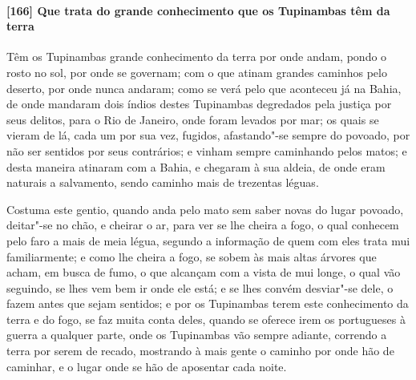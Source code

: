 \begin{linenumbers}
\paragraph{[166] Que trata do grande conhecimento que os Tupinambas têm da terra}\quad
Têm os Tupinambas grande conhecimento da terra por onde andam, pondo o rosto no sol, por
onde se governam; com o que atinam grandes caminhos pelo deserto, por onde nunca andaram;
como se verá pelo que aconteceu já na Bahia, de onde mandaram dois índios destes
Tupinambas degredados pela justiça por seus delitos, para o Rio de Janeiro, onde foram
levados por mar; os quais se vieram de lá, cada um por sua vez, fugidos, afastando"-se
sempre do povoado, por não ser sentidos por seus contrários; e vinham sempre caminhando
pelos matos; e desta maneira atinaram com a Bahia, e chegaram à sua aldeia, de onde eram
naturais a salvamento, sendo caminho mais de trezentas léguas.

Costuma este gentio, quando anda pelo mato sem saber novas do lugar povoado, deitar"-se no
chão, e cheirar o ar, para ver se lhe cheira a fogo, o qual conhecem pelo faro a mais de
meia légua, segundo a informação de quem com eles trata mui familiarmente; e como lhe
cheira a fogo, se sobem às mais altas árvores que acham, em busca de fumo, o que alcançam
com a vista de mui longe, o qual vão seguindo, se lhes vem bem ir onde ele está; e se lhes
convém desviar"-se dele, o fazem antes que sejam sentidos; e por os Tupinambas terem este
conhecimento da terra e do fogo, se faz muita conta deles, quando se oferece irem os
portugueses à guerra a qualquer parte, onde os Tupinambas vão sempre adiante, correndo a
terra por serem de recado, mostrando à mais gente o caminho por onde hão de caminhar, e o
lugar onde se hão de aposentar cada noite.


\end{linenumbers}
